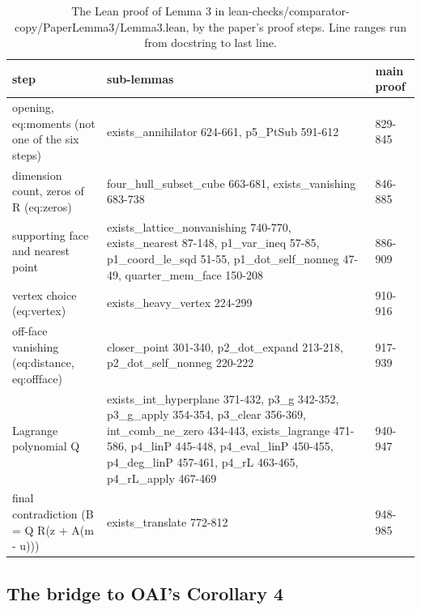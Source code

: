 \begin{table}[tbp]
\caption{The Lean proof of Lemma 3 in lean-checks/\allowbreak comparator-copy/\allowbreak PaperLemma3/\allowbreak Lemma3.lean, by the paper's proof steps. Line ranges run from docstring to last line.}\label{tab:lemma3-structure} %
\small
\begin{tabularx}{\textwidth}{@{}>{\raggedright\arraybackslash}p{3.3cm}>{\raggedright\arraybackslash}X l@{}}
\toprule
step & sub-lemmas & main proof \\ %
\midrule
opening, eq:moments (not one of the six steps) & exists\_annihilator 624-661, p5\_PtSub 591-612 & 829-845 \\ %
dimension count, zeros of R (eq:zeros) & four\_hull\_subset\_cube 663-681, exists\_vanishing 683-738 & 846-885 \\ %
supporting face and nearest point & exists\_lattice\_nonvanishing 740-770, exists\_nearest 87-148, p1\_var\_ineq 57-85, p1\_coord\_le\_sqd 51-55, p1\_dot\_self\_nonneg 47-49, quarter\_mem\_face 150-208 & 886-909 \\ %
vertex choice (eq:vertex) & exists\_heavy\_vertex 224-299 & 910-916 \\ %
off-face vanishing (eq:distance, eq:offface) & closer\_point 301-340, p2\_dot\_expand 213-218, p2\_dot\_self\_nonneg 220-222 & 917-939 \\ %
Lagrange polynomial Q & exists\_int\_hyperplane 371-432, p3\_g 342-352, p3\_g\_apply 354-354, p3\_clear 356-369, int\_comb\_ne\_zero 434-443, exists\_lagrange 471-586, p4\_linP 445-448, p4\_eval\_linP 450-455, p4\_deg\_linP 457-461, p4\_rL 463-465, p4\_rL\_apply 467-469 & 940-947 \\ %
final contradiction (B = Q R(z + A(m - u))) & exists\_translate 772-812 & 948-985 \\ %
\bottomrule
\end{tabularx}
\end{table}

\subsection{The bridge to OAI's Corollary 4}

